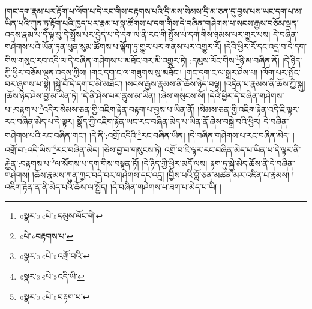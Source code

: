 །གང་དག་རྣམ་པར་རྟོག་པ་ལོག་པ་དེ་རང་གིས་བརྟགས་པའི་དྲི་མས་སེམས་དྲི་མ་ཅན་དུ་བྱས་པས་ཡང་དག་པ་མ་ཡིན་པའི་ཀུན་ཏུ་རྟོག་པའི་ཁྱད་པར་རྣམ་པ་སྣ་ཚོགས་པ་དག་གིས་དེ་བཞིན་གཤེགས་པ་སངས་རྒྱས་བཅོམ་ལྡན་འདས་རྣམ་པ་དེ་ལྟ་བུ་དེ་སྤྲོས་པར་བྱེད་པ་དེ་དག་ལ་ནི་རང་གི་སྤྲོས་པ་དག་གིས་ཉམས་པར་གྱུར་པས། དེ་བཞིན་གཤེགས་པའི་ཡོན་ཏན་ཕུན་སུམ་ཚོགས་པ་ལྐོག་ཏུ་གྱུར་པར་གནས་པར་འགྱུར་རོ། །དེའི་ཕྱིར་རོ་དང་འདྲ་བ་དེ་དག་གིས་གསུང་རབ་འདི་ལ་དེ་བཞིན་གཤེགས་པ་མཐོང་བར་མི་འགྱུར་ཏེ། :དམུས་ལོང་གིས་\footnote{«སྣར་»«པེ་»དམུས་ལོང་གི་}ཉི་མ་བཞིན་ནོ། །དེ་ཉིད་ཀྱི་ཕྱིར་བཅོམ་ལྡན་འདས་ཀྱིས། །གང་དག་ང་ལ་གཟུགས་སུ་མཐོང་། །གང་དག་ང་ལ་སྒྲར་ཤེས་པ། །ལོག་པར་སྤོང་བར་ཞུགས་པ་སྟེ། །སྐྱེ་བོ་དེ་དག་ང་མི་མཐོང་། །སངས་རྒྱས་རྣམས་ནི་ཆོས་ཉིད་བལྟ། །འདྲེན་པ་རྣམས་ནི་ཆོས་ཀྱི་སྐུ། །ཆོས་ཉིད་ཤེས་བྱ་མ་ཡིན་ཏེ། །དེ་ནི་ཤེས་པར་ནུས་མ་ཡིན། །ཞེས་གསུངས་སོ། །དེའི་ཕྱིར་དེ་བཞིན་གཤེགས་པ་:བརྟག་པ་\footnote{«པེ་»བརྟགས་པ་}འདིར་སེམས་ཅན་གྱི་འཇིག་རྟེན་བརྟག་པ་བྱས་པ་ཡིན་ནོ། །སེམས་ཅན་གྱི་འཇིག་རྟེན་འདི་ཇི་ལྟར་རང་བཞིན་མེད་པ་དེ་ལྟར། སྣོད་ཀྱི་འཇིག་རྟེན་ཡང་རང་བཞིན་མེད་པ་ཡིན་ནོ་ཞེས་བསྒྲེ་བའི་ཕྱིར། དེ་བཞིན་གཤེགས་པའི་རང་བཞིན་གང་། །དེ་ནི་:འགྲོ་འདིའི་\footnote{«སྣར་»«པེ་»འགྲོ་བའི་}རང་བཞིན་ཡིན། །དེ་བཞིན་གཤེགས་པ་རང་བཞིན་མེད། །འགྲོ་བ་:འདི་ཡིས་\footnote{«སྣར་»«པེ་»འདི་ཡི་}རང་བཞིན་མེད། །ཅེས་བྱ་བ་གསུངས་ཏེ། འགྲོ་བ་ཇི་ལྟར་རང་བཞིན་མེད་པ་ཡིན་པ་དེ་ལྟར་ནི་རྐྱེན་:བརྟགས་པ་\footnote{«སྣར་»«པེ་»བརྟག་པ་}ལ་སོགས་པ་དག་གིས་བསྟན་ཏོ། །དེ་ཉིད་ཀྱི་ཕྱིར་མདོ་ལས། རྟག་ཏུ་སྐྱེ་མེད་ཆོས་ནི་དེ་བཞིན་གཤེགས། །ཆོས་རྣམས་ཀུན་ཀྱང་བདེ་བར་གཤེགས་དང་འདྲ། །བྱིས་པའི་བློ་ཅན་མཚན་མར་འཛིན་པ་རྣམས། །འཇིག་རྟེན་ན་ནི་མེད་པའི་ཆོས་ལ་སྤྱོད། །དེ་བཞིན་གཤེགས་པ་ཟག་པ་མེད་པ་ཡི། །
